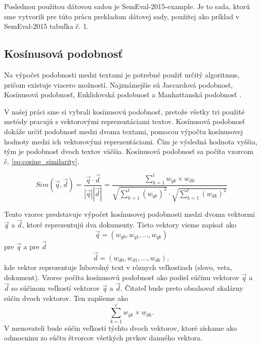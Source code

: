 \noindent
Poslednou použitou dátovou sadou je SemEval-2015-example. Je to sada, ktorú sme vytvorili pre túto prácu prekladom dátovej sady, použitej ako príklad v SemEval-2015 \cite{2015-semeval} tabuľka č. 1.

\subsection{Kosínusová podobnosť}
\label{kap:kosinus}
Na výpočet podobnosti medzi textami je potrebné použiť určitý algoritmus, pričom existuje viacero možností. Najznámejšie sú Jaccardová podobnosť, Kosínusová podobnosť, Euklidovská podobnosť a Manhattanská podobnosť \cite{dalsie}.
\vspace{1em}

\noindent
V našej práci sme si vybrali kosínusovú podobnosť, pretože všetky tri použité metódy pracujú s vektorovými reprezentáciami textov. Kosínusová podobnosť dokáže určiť podobnosť medzi dvoma textami, pomocou výpočtu kosínusovej hodnoty medzi ich vektorovými reprezentáciami. Čím je výsledná hodnota vyššia, tým je podobnosť dvoch textov väčšia. Kosínusová podobnosť sa počíta vzorcom \cite{cosinus} č. \ref{eq:cosine_similarity}.

\begin{equation}
Sim(\vec{q}, \vec{d}) = \frac{\vec{q} \cdot \vec{d}}{|\vec{q}| |\vec{d}|} = \frac{\sum_{k=1}^{t} w_{qk} \times w_{dk}}{\sqrt{\sum_{k=1}^{t} (w_{qk})^2} \cdot \sqrt{\sum_{k=1}^{t} (w_{dk})^2}}
\label{eq:cosine_similarity}
\end{equation}
\vspace{1em}

\noindent
Tento vzorec predstavuje výpočet kosínusovej podobnosti medzi dvoma vektormi \( \vec{q} \) a \( \vec{d} \), ktoré reprezentujú dva dokumenty. Tieto vektory vieme zapísať ako \begin{equation}\vec{q} = (w_{q0}, w_{q1}, ..., w_{qk})\end{equation} pre  \( \vec{q} \) a pre  \( \vec{d} \)\begin{equation}\vec{d} = (w_{d0}, w_{d1}, ..., w_{dk}),\end{equation} kde vektor reprezentuje ľubovolný text v rôznych veľkostiach  (slovo, veta, dokument). Vzorec počíta kosínusovú podobnosť ako podiel súčinu vektorov \( \vec{q} \) a \( \vec{d} \) so súčinom veľkostí vektorov \( \vec{q} \) a \( \vec{d} \). Čitateľ bude preto obsahovať skalárny súčin dvoch vektorov. Ten zapíšeme ako \begin{equation}\sum_{k=1}^{t} w_{qk} \times w_{dk}.\end{equation} V menovateli bude súčin veľkostí týchto dvoch vektorov, ktoré získame ako odmocninu zo súčtu štvorcov všetkých prvkov danného vektora. 

